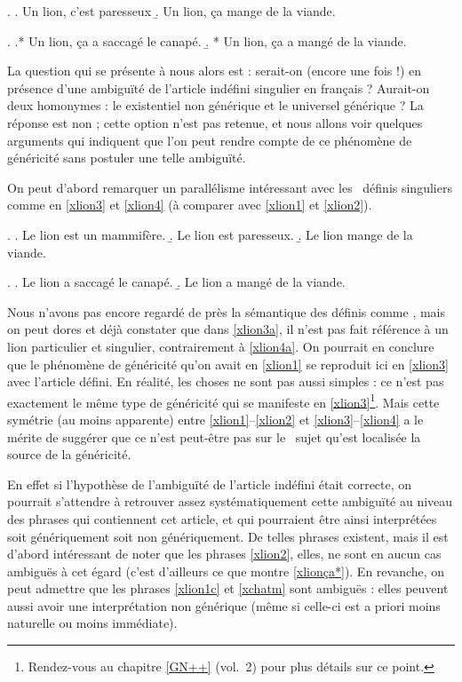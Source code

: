 \ex. \label{xlionça}
\a. Un lion, c'est paresseux
\b. Un lion, ça mange de la viande.

\ex. \label{xlionça*}
\a.* Un lion, ça a saccagé le canapé.
\b. * Un lion, ça a mangé de la viande.


La question qui se présente à nous alors est : serait-on (encore une
fois !) en présence d'une ambiguïté  de l'article indéfini singulier en
français ?  Aurait-on deux homonymes :  le  existentiel non
générique et le  universel générique ? La réponse est non ;
cette option n'est pas retenue, et nous allons voir quelques arguments
qui indiquent que l'on peut rendre compte de ce phénomène de
généricité sans postuler une telle ambiguïté. %

On peut d'abord remarquer un parallélisme intéressant avec les
\GN\ définis singuliers comme en \ref{xlion3} et \ref{xlion4} (à
comparer avec \ref{xlion1} et \ref{xlion2}).

\ex. \label{xlion3}
\a. Le lion est un mammifère.  \label{xlion3a}
\b. Le lion  est paresseux.  
\b. Le lion mange de la viande.

\ex.  \label{xlion4}
\a. Le lion a saccagé le canapé. \label{xlion4a}
\b. Le lion a mangé de la viande.


Nous n'avons pas encore regardé de près la sémantique des {\GN}
définis comme , mais on peut dores et déjà 
constater que dans \ref{xlion3a}, il n'est pas fait référence à un lion
particulier et singulier, contrairement à \ref{xlion4a}. On pourrait
en conclure que le phénomène de généricité qu'on avait en \ref{xlion1} se
reproduit ici en \ref{xlion3} avec l'article défini. En réalité, les
choses ne sont pas aussi simples : ce n'est pas exactement le même type de
généricité qui se manifeste en \ref{xlion3}\footnote{Rendez-vous au
  chapitre \ref{GN++} (vol.~2) pour plus détails sur ce point.}.  Mais cette
symétrie (au moins apparente) entre \ref{xlion1}--\ref{xlion2} et
\ref{xlion3}--\ref{xlion4} a le mérite de suggérer que ce n'est
peut-être pas sur le \GN\ sujet qu'est localisée la source de la
généricité. 

En effet si l'hypothèse de l'ambiguïté de l'article indéfini était
correcte, on pourrait s'attendre à retrouver assez systématiquement
cette ambiguïté au niveau des phrases qui contiennent cet article, et
qui pourraient être  ainsi interprétées soit génériquement soit non
génériquement. De telles phrases existent, mais il est d'abord
intéressant de noter que les phrases \ref{xlion2}, elles, ne sont en
aucun cas ambiguës à cet égard (c'est d'ailleurs ce que montre
\ref{xlionça*}). 
En revanche, on peut admettre que les phrases
\ref{xlion1c} et \ref{xchatm} sont ambiguës : elles peuvent
aussi avoir une interprétation non générique (même si celle-ci est {a
priori} moins naturelle ou moins immédiate).

